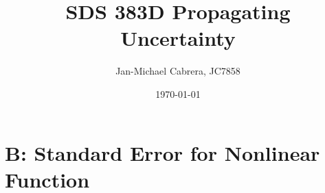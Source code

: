 \documentclass[12pt]{article}
\begin{document}
    \title{SDS 383D Propagating Uncertainty}
    \author{Jan-Michael Cabrera, JC7858}
    \date{\today}
    \maketitle

    \section*{B: Standard Error for Nonlinear Function}

        
\end{document}
